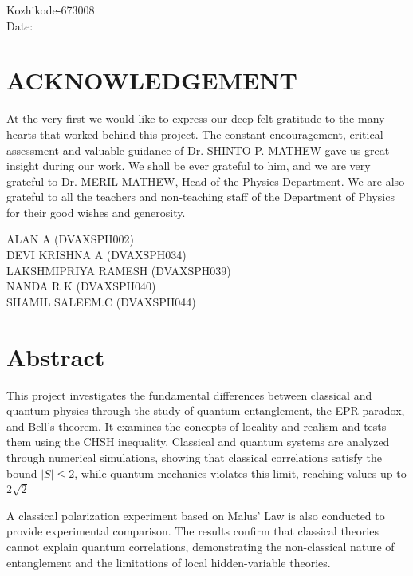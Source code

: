 \documentclass[14pt,a4paper]{extarticle}
\begin{document}
\vspace{1cm}

\noindent Kozhikode-673008\\
Date:
\vspace*{\fill}
\newpage
\vspace*{\fill}
\section*{\centering ACKNOWLEDGEMENT}
\justifying

At the very first we would like to express our deep-felt gratitude to the many hearts that worked behind this project. The constant encouragement, critical assessment and valuable guidance of Dr. SHINTO P. MATHEW gave us great insight during our work. We shall be ever grateful to him, and we are very grateful to Dr. MERIL MATHEW, Head of the Physics Department. We are also grateful to all the teachers and non-teaching staff of the Department of Physics for their good wishes and generosity.

\vspace{2cm}

\begin{flushright}
ALAN A (DVAXSPH002)\\
DEVI KRISHNA A (DVAXSPH034)\\
LAKSHMIPRIYA RAMESH (DVAXSPH039)\\
NANDA R K (DVAXSPH040)\\
SHAMIL SALEEM.C (DVAXSPH044)\\
\end{flushright}
\vspace*{\fill}
\newpage

\vspace*{\fill}
\section*{\centering Abstract}
\vspace{1em}
    This project investigates the fundamental differences between classical and quantum physics through the study of quantum entanglement, the EPR paradox, and Bell’s theorem. It examines the concepts of locality and realism and tests them using the CHSH inequality. Classical and quantum systems are analyzed through numerical simulations, showing that classical correlations satisfy the bound ${|S|\leq2}$, while quantum mechanics violates this limit, reaching values up to $2\sqrt{2}$

    A classical polarization experiment based on Malus’ Law is also conducted to provide experimental comparison. The results confirm that classical theories cannot explain quantum correlations, demonstrating the non-classical nature of entanglement and the limitations of local hidden-variable theories.
\end{document}
